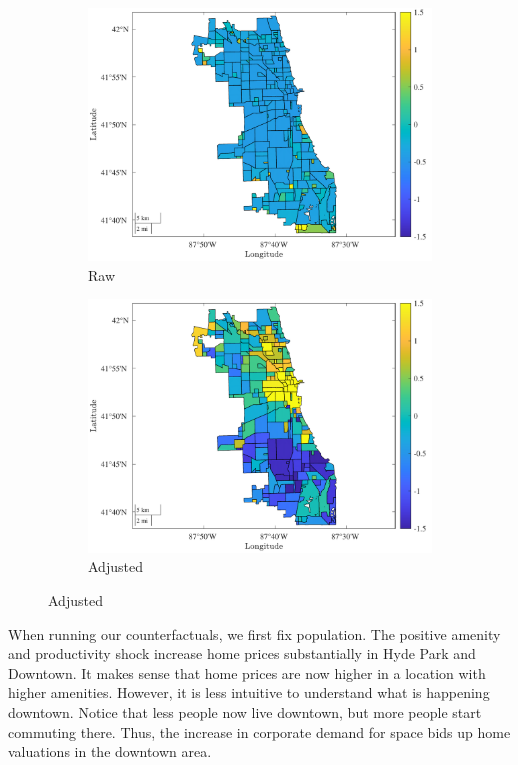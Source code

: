 \documentclass[12pt]{article}
\begin{document}
\begin{figure}[h]
    \centering
    \caption{Production}
    \begin{subfigure}{0.49\textwidth}
         \centering
         \includegraphics[width=\textwidth]{Pset1/Figures/Single Agent/Baseline/prod_raw.pdf}
         \caption{Raw}
    \end{subfigure}  
    \begin{subfigure}{0.49\textwidth}
         \centering \includegraphics[width=\linewidth]{Pset1/Figures/Single Agent/Baseline/prod.pdf}
         \caption{Adjusted}
    \end{subfigure}
    
    \label{fig:prod_base}
\end{figure}
When running our counterfactuals, we first fix population. The positive amenity and productivity shock increase home prices substantially in Hyde Park and Downtown. It makes sense that home prices are now higher in a location with higher amenities. However, it is less intuitive to understand what is happening downtown. Notice that less people now live downtown, but more people start commuting there. Thus, the increase in corporate demand for space bids up home valuations in the downtown area. 
\end{document}
